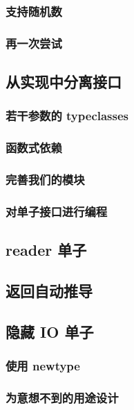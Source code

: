 \documentclass[./main.tex]{subfiles}
\begin{document}
\subsubsection*{支持随机数}


\subsubsection*{再一次尝试}

\subsection*{从实现中分离接口}

\subsubsection*{若干参数的 typeclasses}

\subsubsection*{函数式依赖}

\subsubsection*{完善我们的模块}

\subsubsection*{对单子接口进行编程}

\subsection*{reader 单子}

\subsection*{返回自动推导}

\subsection*{隐藏 IO 单子}

\subsubsection*{使用 newtype}

\subsubsection*{为意想不到的用途设计}
\end{document}
